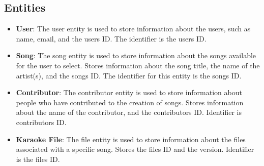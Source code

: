 \documentclass{report}
\title{\Huge{}}
\author{\huge{Nathan Warner}}
\date{\huge{}}
\begin{document}
    \tableofcontents
    \pagebreak 
    \bigbreak \noindent 
    \pagebreak 
    \bigbreak \noindent 
    \subsection{Entities}
    \bigbreak \noindent 
    \begin{itemize}
        \item \textbf{User}: The user entity is used to store information about the users, such as name, email, and the users ID. The identifier is the users ID.
        \item \textbf{Song}: The song entity is used to store information about the songs available for the user to select. Stores information about the song title, the name of the artist(s), and the songs ID. The identifier for this entity is the songs ID.
        \item \textbf{Contributor}: The contributor entity is used to store information about people who have contributed to the creation of songs. Stores information about the name of the contributor, and the contributors ID. Identifier is contributors ID.
        \item \textbf{Karaoke File}: The file entity is used to store information about the files associated with a specific song. Stores the files ID and the version. Identifier is the files ID.
    \end{itemize}
\end{document}
